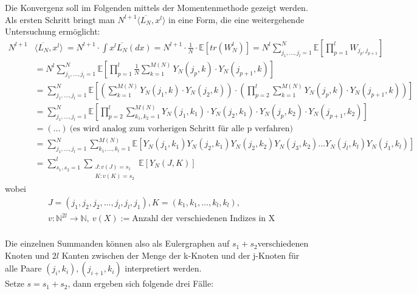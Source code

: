 \documentclass[a4paper, 11pt]{scrreprt}
\newcommand{\EE}{\mathbb{E}}
\newcommand{\NN}{\mathbb{N}}
\newcommand{\student}[1]{\marginnote{{\normalfont\bf #1}}}
\begin{document}
\student{Andreas}
Die Konvergenz soll im Folgenden mittels der Momentenmethode gezeigt werden. Als ersten Schritt bringt man \(N^{l+1} \langle \overline{L_N}, x^l \rangle\) in eine Form, die eine weitergehende Untersuchung ermöglicht:
\begin{equation}
\begin{split}
		N^{l+1} &\langle \overline{L_N}, x^l \rangle\ 
		= N^{l+1} \cdot \int x^l \overline{L_N}(dx) 
		= N^{l+1} \cdot \frac{1}{N} \cdot \EE[tr(W^l_N)] 
		= N^l \sum_{j_1,...,j_l = 1}^N \EE\left[\prod_{p = 1}^l W_{j_p,j_{p+1}}\right] \\
		&= N^l \sum_{j_1,...,j_l = 1}^N \EE\left[\prod_{p = 1}^l \frac{1}{N} \sum_{k = 1}^{M(N)} Y_N(j_p,k) \cdot Y_N(j_{p+1},k) \right] \\
		&= \sum_{j_1,...,j_l = 1}^N \EE \left[\left(\sum_{k = 1}^{M(N)} Y_N(j_1,k) \cdot Y_N(j_2,k)\right) \cdot \left(\prod_{p = 2}^l \sum_{k = 1}^{M(N)} Y_N(j_p,k) \cdot Y_N(j_{p+1},k) \right) \right] \\
		&= \sum_{j_1,...,j_l = 1}^N \EE\left[	\prod_{p = 2}^l \sum_{k_1,k_2 = 1}^{M(N)} Y_N(j_1,k_1) \cdot Y_N(j_2,k_1) \cdot Y_N(j_p,k_2) \cdot Y_N(j_{p+1},k_2) \right] \\
		&= (...)~ \text{(es wird analog zum vorherigen Schritt für alle p verfahren)}  \\
		&= \sum_{j_1,...,j_l = 1}^N \sum_{k_1,...,k_l = 1}^{M(N)} \EE[Y_N(j_1,k_1) Y_N(j_2,k_1) Y_N(j_2,k_2) Y_N(j_3,k_2) ... Y_N(j_l,k_l) Y_N(j_1,k_l)]\\
 &= \sum_{s_1,s_2 = 1}^l \sum_{\substack{J:v(J)=s_1\\ K:v(K)=s_2 }} \EE[Y_N(J,K)]
\end{split}
\end{equation}
wobei 
\begin{align*}
	&J=(j_1,j_2,j_2,...,j_l,j_l,j_1), K=(k_1,k_1,...,k_l,k_l),\\
	&v: \NN^{2l}\to \NN,\ v(X) := \text{Anzahl der verschiedenen Indizes in X}
\end{align*}
\\
\student{Manuela}
Die einzelnen Summanden können also als Eulergraphen auf \(s_1+s_2 \)verschiedenen Knoten und \(2l\) Kanten zwischen der Menge der k-Knoten und der j-Knoten für alle Paare $ (j_i, k_i), (j_{i+1},k_i) $ interpretiert werden.\\
Setze \(s = s_1+s_2\), dann ergeben sich folgende drei Fälle:
\end{document}
